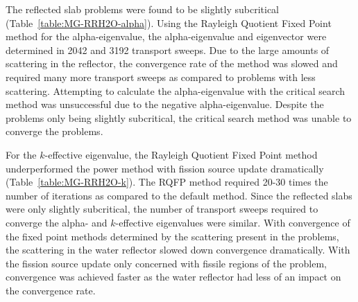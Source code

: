 The reflected slab problems were found to be slightly subcritical (Table~\ref{table:MG-RRH2O-alpha}). Using the Rayleigh Quotient Fixed Point method for the alpha-eigenvalue, the alpha-eigenvalue and eigenvector were determined in 2042 and 3192 transport sweeps. Due to the large amounts of scattering in the reflector, the convergence rate of the method was slowed and required many more transport sweeps as compared to problems with less scattering. Attempting to calculate the alpha-eigenvalue with the critical search method was unsuccessful due to the negative alpha-eigenvalue. Despite the problems only being slightly subcritical, the critical search method was unable to converge the problems.

For the $k$-effective eigenvalue, the Rayleigh Quotient Fixed Point method underperformed the power method with fission source update dramatically (Table~\ref{table:MG-RRH2O-k}). The RQFP method required 20-30 times the number of iterations as compared to the default method. Since the reflected slabs were only slightly subcritical, the number of transport sweeps required to converge the alpha- and $k$-effective eigenvalues were similar. With convergence of the fixed point methods determined by the scattering present in the problems, the scattering in the water reflector slowed down convergence dramatically. With the fission source update only concerned with fissile regions of the problem, convergence was achieved faster as the water reflector had less of an impact on the convergence rate.

